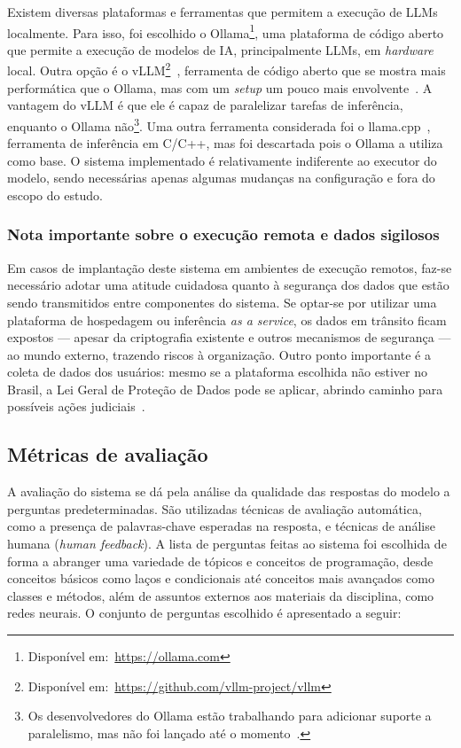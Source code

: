 \documentclass[journal]{IEEEtran}
\begin{document}
\noindent%
Existem diversas plataformas e ferramentas que permitem a execução de LLMs localmente.
Para isso, foi escolhido o Ollama\footnote{Disponível em:~\url{https://ollama.com}}, uma plataforma de código aberto que permite a execução de modelos de IA, principalmente LLMs, em \textit{hardware} local.
Outra opção é o vLLM\footnote{Disponível em:~\url{https://github.com/vllm-project/vllm}}~\cite{kwon2023efficient}, ferramenta de código aberto que se mostra mais performática que o Ollama, mas com um \textit{setup} um pouco mais envolvente~\cite{kwon2023efficient}.
A vantagem do vLLM é que ele é capaz de paralelizar tarefas de inferência, enquanto o Ollama não\footnote{%
Os desenvolvedores do Ollama estão trabalhando para adicionar suporte a paralelismo, mas não foi lançado até o momento~\cite{ollama}.}.
Uma outra ferramenta considerada foi o llama.cpp~\cite{llama.cpp}, ferramenta de inferência em C/C++, mas foi descartada pois o Ollama a utiliza como base.
O sistema implementado é relativamente indiferente ao executor do modelo, sendo necessárias apenas algumas mudanças na configuração e fora do escopo do estudo.

\subsubsection{Nota importante sobre o execução remota e dados sigilosos\label{sec:dados_sigilosos}}

\noindent%
Em casos de implantação deste sistema em ambientes de execução remotos, faz-se necessário adotar uma atitude cuidadosa quanto à segurança dos dados que estão sendo transmitidos entre componentes do sistema.
Se optar-se por utilizar uma plataforma de hospedagem ou inferência \textit{as a service}, os dados em trânsito ficam expostos --- apesar da criptografia existente e outros mecanismos de segurança --- ao mundo externo, trazendo riscos à organização.
Outro ponto importante é a coleta de dados dos usuários: mesmo se a plataforma escolhida não estiver no Brasil, a Lei Geral de Proteção de Dados pode se aplicar, abrindo caminho para possíveis ações judiciais~\cite{brasil2018lgpd}.

\subsection{Métricas de avaliação}

\noindent%
A avaliação do sistema se dá pela análise da qualidade das respostas do modelo a perguntas predeterminadas.
São utilizadas técnicas de avaliação automática, como a presença de palavras-chave esperadas na resposta, e técnicas de análise humana (\textit{human feedback}).
A lista de perguntas feitas ao sistema foi escolhida de forma a abranger uma variedade de tópicos e conceitos de programação, desde conceitos básicos como laços e condicionais até conceitos mais avançados como classes e métodos, além de assuntos externos aos materiais da disciplina, como redes neurais.
O conjunto de perguntas escolhido é apresentado a seguir:
\end{document}
